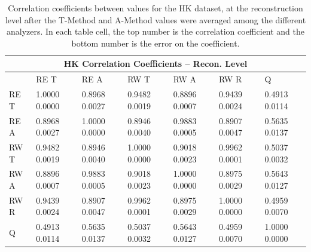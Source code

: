 \begin{table}
\setlength\tabcolsep{15pt}
\small
\centering
\renewcommand{\arraystretch}{1.4}
\begin{tabularx}{0.8\linewidth}{@{\extracolsep{\fill}}lXXXXXX}
  \toprule
  	\multicolumn{7}{c}{{\normalsize HK Correlation Coefficients -- Recon. Level}} \\
  \midrule
  	       & RE T & RE A & RW T & RW A & RW R & \quad Q \\
  \midrule
	RE T   & 1.0000 0.0000 & 0.8968 0.0027 & 0.9482 0.0019 & 0.8896 0.0007 & 0.9439 0.0024 & 0.4913 0.0114  \\
	RE A   & 0.8968 0.0027 & 1.0000 0.0000 & 0.8946 0.0040 & 0.9883 0.0005 & 0.8907 0.0047 & 0.5635 0.0137  \\
	RW T   & 0.9482 0.0019 & 0.8946 0.0040 & 1.0000 0.0000 & 0.9018 0.0023 & 0.9962 0.0001 & 0.5037 0.0032  \\
	RW A   & 0.8896 0.0007 & 0.9883 0.0005 & 0.9018 0.0023 & 1.0000 0.0000 & 0.8975 0.0029 & 0.5643 0.0127  \\
	RW R   & 0.9439 0.0024 & 0.8907 0.0047 & 0.9962 0.0001 & 0.8975 0.0029 & 1.0000 0.0000 & 0.4959 0.0070  \\
	Q      & 0.4913 0.0114 & 0.5635 0.0137 & 0.5037 0.0032 & 0.5643 0.0127 & 0.4959 0.0070 & 1.0000 0.0000  \\
  \bottomrule
\end{tabularx}
\caption[]{Correlation coefficients between \R values for the HK dataset, at the reconstruction level after the \RW T-Method and A-Method \R values were averaged among the different analyzers. In each table cell, the top number is the correlation coefficient and the bottom number is the error on the coefficient.}
\label{tab:Corrs_HK_recon}
\end{table}


